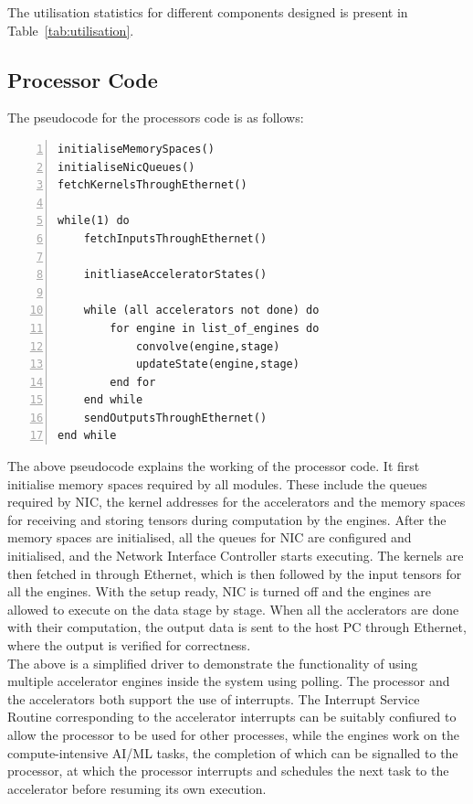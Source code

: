 \documentclass[a4paper,12pt, final]{report}
\begin{document}
The utilisation statistics for different components designed is present in Table~\ref{tab:utilisation}.

\subsection{Processor Code}

The pseudocode for the processors code is as follows:

\begin{Verbatim}[numbers=left]
initialiseMemorySpaces()
initialiseNicQueues()
fetchKernelsThroughEthernet()

while(1) do
	fetchInputsThroughEthernet()
	
	initliaseAcceleratorStates()
	
	while (all accelerators not done) do
		for engine in list_of_engines do
			convolve(engine,stage)
			updateState(engine,stage)
		end for
	end while
	sendOutputsThroughEthernet()
end while
\end{Verbatim}

The above pseudocode explains the working of the processor code. It first initialise memory spaces required by all modules. These include the queues required by NIC, the kernel addresses for the accelerators and the memory spaces for receiving and storing tensors during computation by the engines. After the memory spaces are initialised, all the queues for NIC are configured and initialised, and the Network Interface Controller starts executing. The kernels are then fetched in through Ethernet, which is then followed by the input tensors for all the engines. With the setup ready, NIC is turned off and the engines are allowed to execute on the data stage by stage. When all the acclerators are done with their computation, the output data is sent to the host PC through Ethernet, where the output is verified for correctness.
\\

The above is a simplified driver to demonstrate the functionality of using multiple accelerator engines inside the system using polling. The processor and the  accelerators both support the use of interrupts. The Interrupt Service Routine corresponding to the accelerator interrupts can be suitably confiured to allow the processor to be used for other processes, while the engines work on the compute-intensive AI/ML tasks, the completion of which can be signalled to the processor, at which the processor interrupts and schedules the next task to the accelerator before resuming its own execution.
\\
\end{document}
